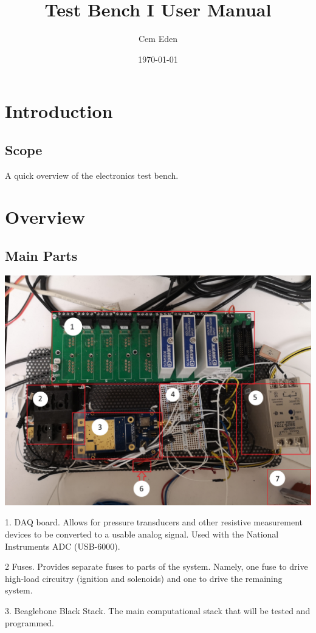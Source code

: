 \documentclass[12pt,article]{memoir}
\title{Test Bench I User Manual}
\author{Cem Eden}
\date{\today}
\begin{document}
	


\tableofcontents*
\clearpage


\chapter{Introduction}
\section{Scope}
A quick overview of the electronics test bench.

\newpage
\chapter{Overview}
\section{Main Parts}
\includegraphics[width=7in]{EI00002_overview.jpg}

1. DAQ board. Allows for pressure transducers and other resistive measurement devices to be converted to a usable analog signal. Used with the National Instruments ADC (USB-6000).

2 Fuses. Provides separate fuses to parts of the system. Namely, one fuse to drive high-load circuitry (ignition and solenoids) and one to drive the remaining system.

3. Beaglebone Black Stack. The main computational stack that will be tested and programmed.
\end{document}
